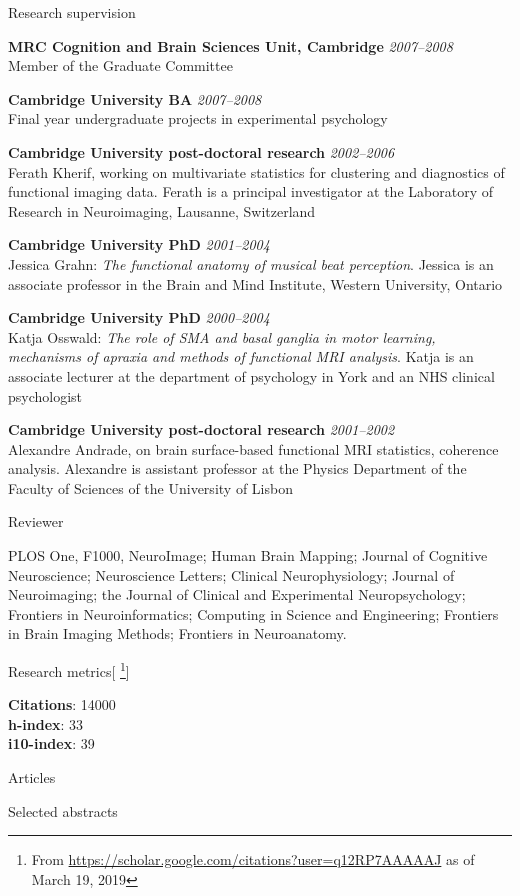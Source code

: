 \documentclass{cv}
\newcommand{\PlaceDateNote}[3]{{\bf #1} \hfill {\em #2} \\#3}
\newcommand{\CBU}{MRC Cognition and Brain Sciences Unit, Cambridge}
\begin{document}
\begin{cvSection}{Research supervision}

\PlaceDateNote{\CBU}{2007--2008}
{Member of the Graduate Committee}

\PlaceDateNote{Cambridge University BA}{2007--2008}
{Final year undergraduate projects in experimental psychology}

\PlaceDateNote{Cambridge University post-doctoral research}{2002--2006}
{Ferath Kherif, working on multivariate statistics for clustering and
diagnostics of functional imaging data. Ferath is a principal investigator at
the Laboratory of Research in Neuroimaging, Lausanne, Switzerland}

\PlaceDateNote{Cambridge University PhD}{2001--2004}
{Jessica Grahn: {\em The functional anatomy of musical beat perception}.
Jessica is an associate professor in the Brain and Mind Institute, Western
University, Ontario}

\PlaceDateNote{Cambridge University PhD}{2000--2004}
{Katja Osswald: {\em The role of SMA and basal ganglia in motor learning,
mechanisms of apraxia and methods of functional MRI analysis}. Katja is an
associate lecturer at the department of psychology in York and an NHS clinical
psychologist}

\PlaceDateNote{Cambridge University post-doctoral research}{2001--2002}
{Alexandre Andrade, on brain surface-based functional MRI statistics, coherence
analysis.  Alexandre is assistant professor at the Physics Department of the
Faculty of Sciences of the University of Lisbon}

\end{cvSection}

\begin{cvSection}{Reviewer}

    PLOS One, F1000, NeuroImage; Human Brain Mapping; Journal of Cognitive
    Neuroscience; Neuroscience Letters; Clinical Neurophysiology; Journal of
    Neuroimaging; the Journal of Clinical and Experimental Neuropsychology;
    Frontiers in Neuroinformatics; Computing in Science and Engineering;
    Frontiers in Brain Imaging Methods; Frontiers in Neuroanatomy.

\end{cvSection}

\begin{cvSection}{Research metrics}[
    \footnote{ From
    \url{https://scholar.google.com/citations?user=q12RP7AAAAAJ} as of March
    19, 2019}]

{\bf Citations}: 14000 \\
{\bf h-index}: 33 \\
{\bf i10-index}: 39

\end{cvSection}

\begin{cvSection}{Articles}

\printbibliography[heading=none,
    keyword=article,
    notkeyword=omit]

\end{cvSection}

\begin{cvSection}{Selected abstracts}

\printbibliography[heading=none,
    keyword=abstract,
    notkeyword=omit]

\end{cvSection}
\end{document}

